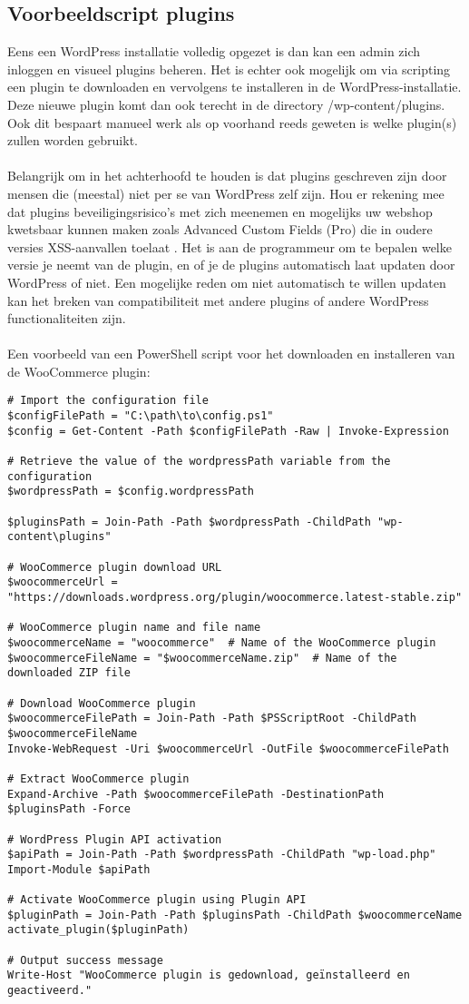 \subsection{Voorbeeldscript plugins}
Eens een WordPress installatie volledig opgezet is dan kan een admin zich inloggen en visueel plugins beheren. Het is echter ook mogelijk om via scripting een plugin te downloaden en vervolgens te installeren in de WordPress-installatie. Deze nieuwe plugin komt dan ook terecht in de directory /wp-content/plugins. Ook dit bespaart manueel werk als op voorhand reeds geweten is welke plugin(s) zullen worden gebruikt.
\\\\
Belangrijk om in het achterhoofd te houden is dat plugins geschreven zijn door mensen die (meestal) niet per se van WordPress zelf zijn. Hou er rekening mee dat plugins beveiligingsrisico's met zich meenemen en mogelijks uw webshop kwetsbaar kunnen maken zoals Advanced Custom Fields (Pro) die in oudere versies XSS-aanvallen toelaat \autocite{Leemputten2023}. Het is aan de programmeur om te bepalen welke versie je neemt van de plugin, en of je de plugins automatisch laat updaten door WordPress of niet. Een mogelijke reden om niet automatisch te willen updaten kan het breken van compatibiliteit met andere plugins of andere WordPress functionaliteiten zijn.
\\\\
Een voorbeeld van een PowerShell script voor het downloaden en installeren van de WooCommerce plugin:
\begin{verbatim}
# Import the configuration file
$configFilePath = "C:\path\to\config.ps1"
$config = Get-Content -Path $configFilePath -Raw | Invoke-Expression

# Retrieve the value of the wordpressPath variable from the configuration
$wordpressPath = $config.wordpressPath

$pluginsPath = Join-Path -Path $wordpressPath -ChildPath "wp-content\plugins"  

# WooCommerce plugin download URL
$woocommerceUrl = "https://downloads.wordpress.org/plugin/woocommerce.latest-stable.zip" 

# WooCommerce plugin name and file name
$woocommerceName = "woocommerce"  # Name of the WooCommerce plugin
$woocommerceFileName = "$woocommerceName.zip"  # Name of the downloaded ZIP file

# Download WooCommerce plugin
$woocommerceFilePath = Join-Path -Path $PSScriptRoot -ChildPath $woocommerceFileName
Invoke-WebRequest -Uri $woocommerceUrl -OutFile $woocommerceFilePath

# Extract WooCommerce plugin
Expand-Archive -Path $woocommerceFilePath -DestinationPath $pluginsPath -Force

# WordPress Plugin API activation
$apiPath = Join-Path -Path $wordpressPath -ChildPath "wp-load.php"
Import-Module $apiPath

# Activate WooCommerce plugin using Plugin API
$pluginPath = Join-Path -Path $pluginsPath -ChildPath $woocommerceName 
activate_plugin($pluginPath)

# Output success message
Write-Host "WooCommerce plugin is gedownload, geïnstalleerd en geactiveerd."
\end{verbatim}

